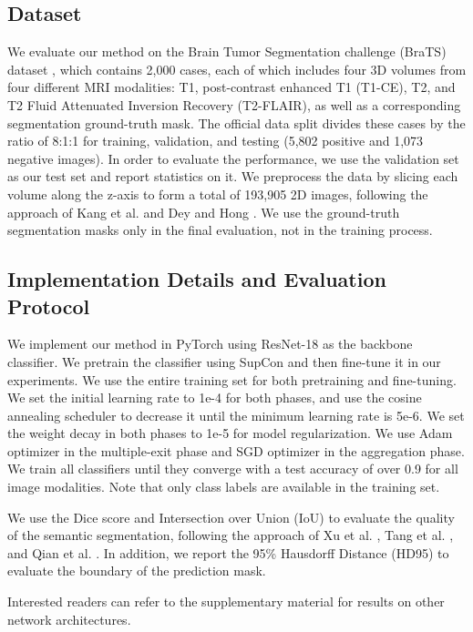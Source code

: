 

\subsection{Dataset}

We evaluate our method on the Brain Tumor Segmentation challenge (BraTS) dataset \cite{menze2014multimodal,bakas2017advancing,bakas2018identifying}, which contains 2,000 cases, each of which includes four 3D volumes from four different MRI modalities: T1, post-contrast enhanced T1 (T1-CE), T2, and T2 Fluid Attenuated Inversion Recovery (T2-FLAIR), as well as a corresponding segmentation ground-truth mask. The official data split divides these cases by the ratio of 8:1:1 for training, validation, and testing (5,802 positive and 1,073 negative images). In order to evaluate the performance, we use the validation set as our test set and report statistics on it. We preprocess the data by slicing each volume along the z-axis to form a total of 193,905 2D images, following the approach of Kang et al. \cite{kang2021towards} and Dey and Hong \cite{dey2021asc}. We use the ground-truth segmentation masks only in the final evaluation, not in the training process.

\subsection{Implementation Details and Evaluation Protocol}

We implement our method in PyTorch using ResNet-18 as the backbone classifier. We pretrain the classifier using SupCon \cite{khosla2020supervised} and then fine-tune it in our experiments. We use the entire training set for both pretraining and fine-tuning. We set the initial learning rate to 1e-4 for both phases, and use the cosine annealing scheduler to decrease it until the minimum learning rate is 5e-6. We set the weight decay in both phases to 1e-5 for model regularization. We use Adam optimizer in the multiple-exit phase and SGD optimizer in the aggregation phase. We train all classifiers until they converge with a test accuracy of over 0.9 for all image modalities. Note that only class labels are available in the training set.

We use the Dice score and Intersection over Union (IoU) to evaluate the quality of the semantic segmentation, following the approach of Xu et al. \cite{xu2019whole}, Tang et al. \cite{tang2021m}, and Qian et al. \cite{qian2022transformer}. In addition, we report the 95\% Hausdorff Distance (HD95) to evaluate the boundary of the prediction mask.

Interested readers can refer to the supplementary material for results on other network architectures.